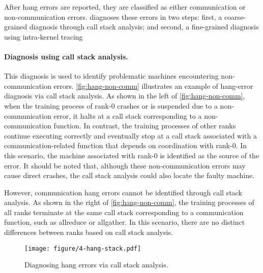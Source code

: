 After hang errors are reported, they are classified as either communication or non-communication errors. \sysname{} diagnoses these errors in two steps: first, a coarse-grained diagnosis through call stack analysis; and second, a fine-grained diagnosis using intra-kernel tracing

\paragraph{Diagnosis using call stack analysis.} 
This diagnosis is used to identify problematic machines encountering non-communication errors. 
\autoref{fig:hang-non-comm} illustrates an example of hang-error diagnosis via call stack analysis.
As shown in the left of \autoref{fig:hang-non-comm}, when the training process of rank-$0$ crashes or is suspended due to a non-communication error, it halts at a call stack corresponding to a non-communication function.
In contrast, the training processes of other ranks continue executing correctly and eventually stop at a call stack associated with a communication-related function that depends on coordination with rank-$0$.
In this scenario, the machine associated with rank-$0$ is identified as the source of the error.
It should be noted that, although these non-communication errors may cause direct crashes, the call stack analysis could also locate the faulty machine. 


However, communication hang errors cannot be identified through call stack analysis.
As shown in the right of \autoref{fig:hang-non-comm}, the training processes of all ranks terminate at the same call stack corresponding to a communication function, such as allreduce or allgather.
In this scenario, there are no distinct differences between ranks based on call stack analysis.

\begin{figure}
    \centering
    \texttt{[image: figure/4-hang-stack.pdf]}
    \caption{Diagnosing hang errors via call stack analysis.}
    \label{fig:hang-non-comm}
    \vspace{-4mm}
\end{figure}

